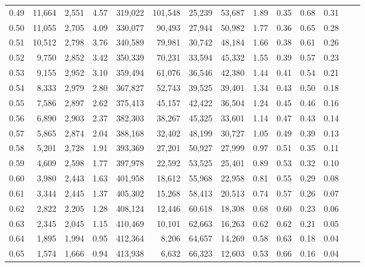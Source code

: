 \begin{tabular}{rrrrrrrrrrrrrr}
0.49 &  11,664 &  2,551 &    4.57 &  319,022 &  101,548 &  25,239 &  53,687 &  1.89 &  0.35 &  0.68 &      0.31 \\
0.50 &  11,055 &  2,705 &    4.09 &  330,077 &   90,493 &  27,944 &  50,982 &  1.77 &  0.36 &  0.65 &      0.28 \\
0.51 &  10,512 &  2,798 &    3.76 &  340,589 &   79,981 &  30,742 &  48,184 &  1.66 &  0.38 &  0.61 &      0.26 \\
0.52 &   9,750 &  2,852 &    3.42 &  350,339 &   70,231 &  33,594 &  45,332 &  1.55 &  0.39 &  0.57 &      0.23 \\
0.53 &   9,155 &  2,952 &    3.10 &  359,494 &   61,076 &  36,546 &  42,380 &  1.44 &  0.41 &  0.54 &      0.21 \\
0.54 &   8,333 &  2,979 &    2.80 &  367,827 &   52,743 &  39,525 &  39,401 &  1.34 &  0.43 &  0.50 &      0.18 \\
0.55 &   7,586 &  2,897 &    2.62 &  375,413 &   45,157 &  42,422 &  36,504 &  1.24 &  0.45 &  0.46 &      0.16 \\
0.56 &   6,890 &  2,903 &    2.37 &  382,303 &   38,267 &  45,325 &  33,601 &  1.14 &  0.47 &  0.43 &      0.14 \\
0.57 &   5,865 &  2,874 &    2.04 &  388,168 &   32,402 &  48,199 &  30,727 &  1.05 &  0.49 &  0.39 &      0.13 \\
0.58 &   5,201 &  2,728 &    1.91 &  393,369 &   27,201 &  50,927 &  27,999 &  0.97 &  0.51 &  0.35 &      0.11 \\
0.59 &   4,609 &  2,598 &    1.77 &  397,978 &   22,592 &  53,525 &  25,401 &  0.89 &  0.53 &  0.32 &      0.10 \\
0.60 &   3,980 &  2,443 &    1.63 &  401,958 &   18,612 &  55,968 &  22,958 &  0.81 &  0.55 &  0.29 &      0.08 \\
0.61 &   3,344 &  2,445 &    1.37 &  405,302 &   15,268 &  58,413 &  20,513 &  0.74 &  0.57 &  0.26 &      0.07 \\
0.62 &   2,822 &  2,205 &    1.28 &  408,124 &   12,446 &  60,618 &  18,308 &  0.68 &  0.60 &  0.23 &      0.06 \\
0.63 &   2,345 &  2,045 &    1.15 &  410,469 &   10,101 &  62,663 &  16,263 &  0.62 &  0.62 &  0.21 &      0.05 \\
0.64 &   1,895 &  1,994 &    0.95 &  412,364 &    8,206 &  64,657 &  14,269 &  0.58 &  0.63 &  0.18 &      0.04 \\
0.65 &   1,574 &  1,666 &    0.94 &  413,938 &    6,632 &  66,323 &  12,603 &  0.53 &  0.66 &  0.16 &      0.04 \\

\end{tabular}
